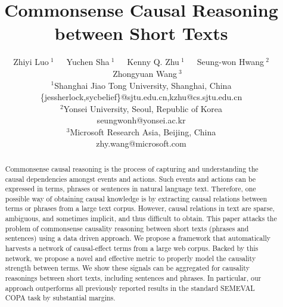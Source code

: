 \documentclass[letterpaper]{article}
\begin{document}
\title{Commonsense Causal Reasoning between Short Texts}

\author{
\AND
Zhiyi Luo{\small $~^{1}$}~~~Yuchen Sha{\small $~^{1}$}~~~Kenny Q. Zhu{\small $~^{1}$}~~~Seung-won Hwang{\small $~^{2}$}~~~Zhongyuan Wang{\small $~^{3}$}\\
{\small $^{1}$}Shanghai Jiao Tong University, Shanghai, China\\
\{jessherlock,sycbelief\}@sjtu.edu.cn,kzhu@cs.sjtu.edu.cn\\
{\small $^{2}$}Yonsei University, Seoul, Republic of Korea\\
seungwonh@yonsei.ac.kr\\
{\small $^{3}$}Microsoft Research Asia, Beijing, China\\
zhy.wang@microsoft.com
}

\maketitle
\begin{abstract}
Commonsense causal reasoning is the process of capturing and understanding
the causal dependencies amongst events and actions.
Such events and actions can be expressed in terms, phrases or
sentences in natural language text.
Therefore, one possible way of obtaining causal knowledge is by extracting
causal relations between terms or phrases from a large text corpus.
However, causal relations in text are sparse, ambiguous, and sometimes implicit,
and thus difficult to obtain.
This paper attacks the problem of commonsense causality reasoning between short
texts (phrases and sentences) using a data driven approach.
We propose a framework that automatically harvests a network of
causal-effect terms from a large web corpus.
Backed by this network, we propose a novel and effective metric to properly
model the causality strength between terms. We show these signals
can be aggregated for causality reasonings between
short texts, including sentences and phrases.
In particular, our approach outperforms all previously
reported results in the standard SEMEVAL COPA task by substantial margins.

\end{abstract}









\end{document}
